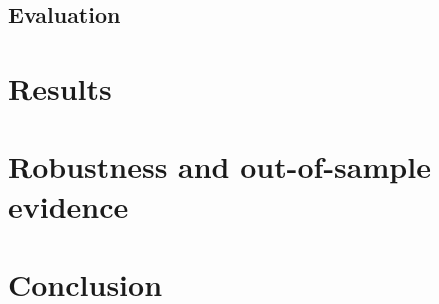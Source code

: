 \documentclass[11pt]{article}
\begin{document}
\subsection{Evaluation}
\label{sec:evaluation}

\section{Results}
\label{sec:results}
%
%

\section{Robustness and out-of-sample evidence}
\label{sec:robustness}

\section{Conclusion}
\label{sec:conclusion}



\end{document}
